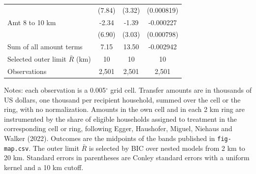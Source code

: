 \begin{table}[htbp]
\begin{tabular}{lccc}
 & (7.84) & (3.32) & (0.000819) \\
Amt 8 to 10 km & -2.34 & -1.39 & -0.000227 \\
 & (6.90) & (3.03) & (0.000798) \\
Sum of all amount terms & 7.15 & 13.50 & -0.002942 \\
\hline
Selected outer limit $\bar{R}$ (km) & 10 & 10 & 10 \\
Observations & 2,501 & 2,501 & 2,501 \\
\hline\hline
\end{tabular}
\begin{minipage}{\textwidth}
\footnotesize
Notes: each observation is a 0.005$^\circ$ grid cell. Transfer amounts are in thousands of US dollars, one thousand per recipient household, summed over the cell or the ring, with no normalization. Amounts in the own cell and in each 2 km ring are instrumented by the share of eligible households assigned to treatment in the corresponding cell or ring, following Egger, Haushofer, Miguel, Niehaus and Walker (2022). Outcomes are the midpoints of the bands published in \texttt{fig-map.csv}. The outer limit $\bar{R}$ is selected by BIC over nested models from 2 km to 20 km. Standard errors in parentheses are Conley standard errors with a uniform kernel and a 10 km cutoff.
\end{minipage}
\end{table}
